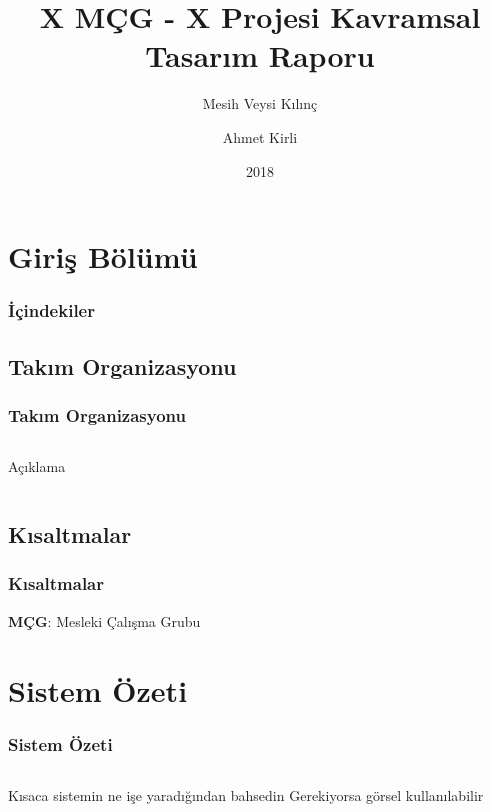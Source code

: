 \documentclass{beamer}
\title{X MÇG - X Projesi Kavramsal Tasarım Raporu}
\author[Kirli, Kılınç]{Mesih Veysi Kılınç \and
                       Ahmet Kirli}
\date{2018}
\begin{document}
\section[Giriş]{Giriş Bölümü}
\frame{\titlepage}

\begin{frame}
\frametitle{İçindekiler}
\tableofcontents
\end{frame}

\subsection[Takım Organizasyonu]{Takım Organizasyonu}
\begin{frame}
\frametitle{Takım Organizasyonu}
    \begin{columns}[c]
        \column{4in}
        Açıklama
    \end{columns}
    \begin{columns}
        \column{4in}
    \end{columns}
\end{frame}

\subsection{Kısaltmalar}
\begin{frame}
\frametitle{Kısaltmalar}
    \textbf{MÇG}: Mesleki Çalışma Grubu
\end{frame}

\section{Sistem Özeti}
\begin{frame}
\frametitle{Sistem Özeti}
    \begin{columns}[c]
        \column{2in}
        Kısaca sistemin ne işe yaradığından bahsedin
        \column{2in}
        Gerekiyorsa görsel kullanılabilir
    \end{columns}
\end{frame}
\end{document}
